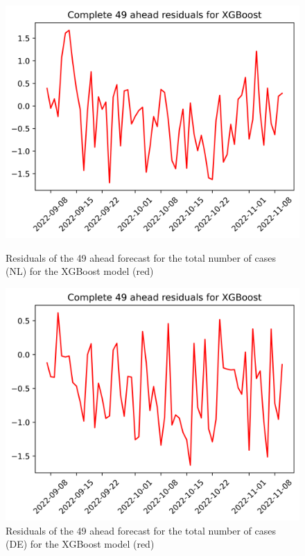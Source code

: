 \begin{figure}

\begin{minipage}{.45\textwidth}
  \centering
  \includegraphics[width=\linewidth]{pics/49_ah/49_ahead_errors_XGBoost.png}
  \caption{Residuals of the 49 ahead forecast for the total number of cases (NL) for the XGBoost model (red)}
  \label{fig:tot_cases_error_49_xgb}
\end{minipage}
\begin{minipage}{.45\textwidth}
  \centering
  \includegraphics[width=\linewidth]{pics/49_ah/DE_49_ahead_errors_XGBoost.png}
  \caption{Residuals of the 49 ahead forecast for the total number of cases (DE) for the XGBoost model (red)}
  \label{fig:tot_cases_error_49_xgb_DE}
\end{minipage}

\end{figure}
